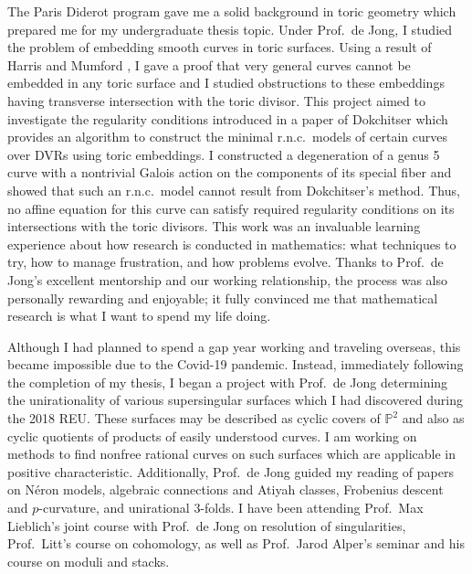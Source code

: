 \documentclass[11pt]{article}
\begin{document}
\par
The Paris Diderot program gave me a solid background in toric geometry which prepared me for my undergraduate thesis topic. Under Prof.\ de Jong, I studied the problem of embedding smooth curves in toric surfaces. Using a result of Harris and Mumford , I gave a proof that very general curves cannot be embedded in any toric surface and I studied obstructions to these embeddings having transverse intersection with the toric divisor. This project aimed to investigate the regularity conditions introduced in a paper of Dokchitser  which provides an algorithm to construct the minimal r.n.c.\ models of certain curves over DVRs using toric embeddings. I constructed a degeneration of a genus 5 curve with a nontrivial Galois action on the components of its special fiber and showed that such an r.n.c.\ model cannot result from Dokchitser's method. Thus, no affine equation for this curve can satisfy required regularity conditions on its intersections with the toric divisors. This work was an invaluable learning experience about how research is conducted in mathematics: what techniques to try, how to manage frustration, and how problems evolve. Thanks to Prof.\ de Jong’s excellent mentorship and our working relationship, the process was also personally rewarding and enjoyable; it fully convinced me that mathematical research is what I want to spend my life doing. 
\par 
Although I had planned to spend a gap year working and traveling overseas, this became impossible due to the Covid-19 pandemic. Instead, immediately following the completion of my thesis, I began a project with Prof.\ de Jong determining the unirationality of various supersingular surfaces which I had discovered during the 2018 REU. These surfaces may be described as cyclic covers of $\mathbb{P}^2$ and also as cyclic quotients of products of easily understood curves. I am working on methods to find nonfree rational curves on such surfaces which are applicable in positive characteristic. Additionally, Prof.\ de Jong guided my reading of papers on N\'{e}ron models, algebraic connections and Atiyah classes, Frobenius descent and $p$-curvature, and unirational $3$-folds.  I have been attending Prof.\ Max Lieblich's joint course with Prof.\ de Jong on resolution of singularities, Prof.\ Litt's course on \etale cohomology, as well as Prof.\ Jarod Alper’s seminar and his course on moduli and stacks.
\par
\end{document}

